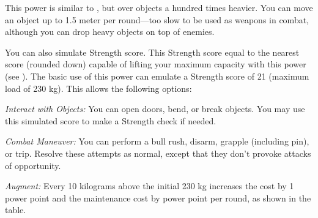 {
	This power is similar to , but over objects a hundred times heavier. You can move an object up to 1.5 meter per round---too slow to be used as weapons in combat, although you can drop heavy objects on top of enemies.

	You can also simulate Strength score. This Strength score equal to the nearest score (rounded down) capable of lifting your maximum capacity with this power (see ). The basic use of this power can emulate a Strength score of 21 (maximum load of 230 kg). This allows the following options:
	\begin{itemize*}
	\item \textit{Interact with Objects:} You can open doors, bend, or break objects. You may use this simulated score to make a Strength check if needed.
	\item \textit{Combat Maneuver:} You can perform a bull rush, disarm, grapple (including pin), or trip. Resolve these attempts as normal, except that they don't provoke attacks of opportunity.
	\end{itemize*}

	\textit{Augment:} Every 10 kilograms above the initial 230 kg increases the cost by 1 power point and the maintenance cost by \onehalf power point per round, as shown in the table. 

}
